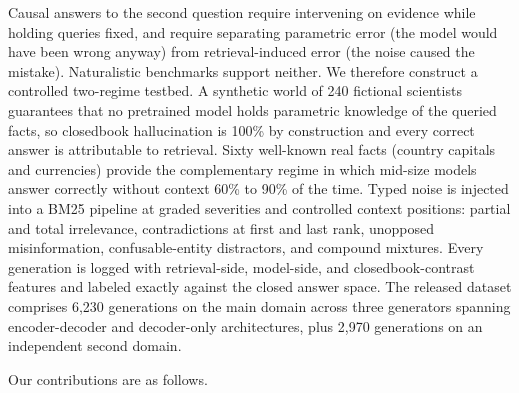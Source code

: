 \documentclass[11pt]{article}
\begin{document}
Causal answers to the second question require intervening on evidence
while holding queries fixed, and require separating parametric error
(the model would have been wrong anyway) from retrieval-induced error
(the noise caused the mistake). Naturalistic benchmarks support
neither. We therefore construct a controlled two-regime testbed. A
synthetic world of 240 fictional scientists guarantees that no
pretrained model holds parametric knowledge of the queried facts, so
closedbook hallucination is 100\% by construction and every correct
answer is attributable to retrieval. Sixty well-known real facts
(country capitals and currencies) provide the complementary regime in
which mid-size models answer correctly without context 60\% to 90\% of
the time. Typed noise is injected into a BM25 pipeline at graded
severities and controlled context positions: partial and total
irrelevance, contradictions at first and last rank, unopposed
misinformation, confusable-entity distractors, and compound mixtures.
Every generation is logged with retrieval-side, model-side, and
closedbook-contrast features and labeled exactly against the closed
answer space. The released dataset comprises 6{,}230 generations on the main
domain across three generators spanning encoder-decoder and
decoder-only architectures, plus 2{,}970 generations on an independent
second domain.

Our contributions are as follows.
\end{document}
